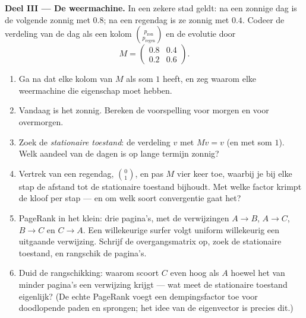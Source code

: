 \begin{problem}
\medskip
\noindent\textbf{Deel III --- De weermachine.}
In een zekere stad geldt: na een zonnige dag is de volgende zonnig met 
$0.8$; na een regendag is ze zonnig met  $0.4$. Codeer de verdeling van
de dag als een kolom $\binom{p_{\text{zon}}}{p_{\text{regen}}}$ en de evolutie
door
\[
M = \begin{pmatrix} 0.8 & 0.4\\ 0.2 & 0.6 \end{pmatrix}.
\]
\begin{enumerate}[resume]
  \item Ga na dat elke kolom van $M$ als som $1$ heeft, en zeg waarom elke
        weermachine die eigenschap moet hebben.
  \item Vandaag is het zonnig. Bereken de voorspelling voor morgen en voor
        overmorgen.
  \item Zoek de \emph{stationaire toestand}: de verdeling $v$ met $Mv = v$
        (en met som $1$). Welk aandeel van de dagen is op lange termijn
        zonnig?
  \item Vertrek van een regendag, $\binom01$, en pas $M$ vier keer toe, waarbij
        je bij elke stap de afstand tot de stationaire toestand bijhoudt. Met
        welke factor krimpt de kloof per stap --- en om welk soort convergentie
        gaat het?
  \item PageRank in het klein: drie pagina's, met de verwijzingen
        $A \to B$, $A \to C$, $B \to C$ en $C \to A$. Een willekeurige surfer
        volgt uniform willekeurig een uitgaande verwijzing. Schrijf de
        overgangsmatrix op, zoek de stationaire toestand, en rangschik de
        pagina's.
  \item Duid de rangschikking: waarom scoort $C$ even hoog als $A$ hoewel het
        van minder pagina's een verwijzing krijgt --- wat meet de stationaire
        toestand eigenlijk? (De echte PageRank voegt een dempingsfactor toe
        voor doodlopende paden en sprongen; het idee van de eigenvector is
        precies dit.)
\end{enumerate}


\end{problem}
